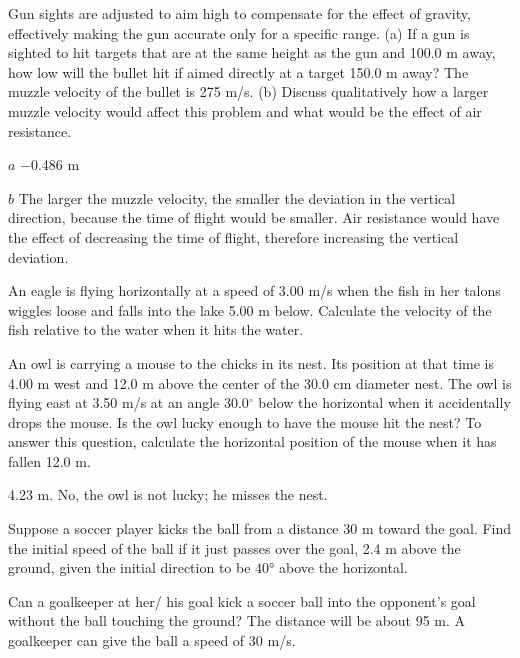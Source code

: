 \documentclass[
]{book}
\begin{document}
\hypertarget{fs-id1796436}{}
\leavevmode{}%
Gun sights are adjusted to aim high to compensate for the effect of
gravity, effectively making the gun accurate only for a specific range.
(a) If a gun is sighted to hit targets that are at the same height as
the gun and 100.0 m away, how low will the bullet hit if aimed directly
at a target 150.0 m away? The muzzle velocity of the bullet is 275 m/s.
(b) Discuss qualitatively how a larger muzzle velocity would affect this
problem and what would be the effect of air resistance.

\leavevmode{}%
\(a\) −0.486 m

\(b\) The larger the muzzle velocity, the smaller the deviation in the
vertical direction, because the time of flight would be smaller. Air
resistance would have the effect of decreasing the time of flight,
therefore increasing the vertical deviation.

\hypertarget{fs-id2177814}{}
\leavevmode{}%
An eagle is flying horizontally at a speed of 3.00 m/s when the fish in
her talons wiggles loose and falls into the lake 5.00 m below. Calculate
the velocity of the fish relative to the water when it hits the water.

\hypertarget{fs-id1914025}{}
\leavevmode{}%
An owl is carrying a mouse to the chicks in its nest. Its position at
that time is 4.00 m west and 12.0 m above the center of the 30.0 cm
diameter nest. The owl is flying east at 3.50 m/s at an angle
\(30.0{^\circ}{}\) below the horizontal when it accidentally drops the
mouse. Is the owl lucky enough to have the mouse hit the nest? To answer
this question, calculate the horizontal position of the mouse when it
has fallen 12.0 m.

\leavevmode{}%
4.23 m. No, the owl is not lucky; he misses the nest.

\hypertarget{fs-id1403577}{}
\leavevmode{}%
Suppose a soccer player kicks the ball from a distance 30 m toward the
goal. Find the initial speed of the ball if it just passes over the
goal, 2.4 m above the ground, given the initial direction to be
\(\text{40°}{}\) above the horizontal.

\hypertarget{fs-id2260735}{}
\leavevmode{}%
Can a goalkeeper at her/ his goal kick a soccer ball into the
opponent's goal without the ball touching the ground? The distance will
be about 95 m. A goalkeeper can give the ball a speed of 30 m/s.
\end{document}
